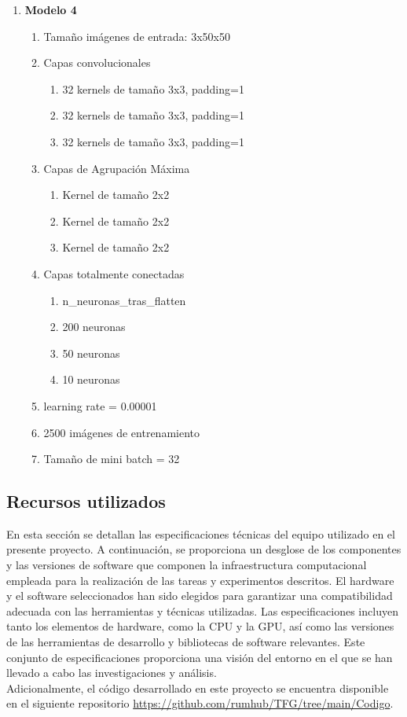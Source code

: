 \begin{enumerate}
	\item \textbf{Modelo 4}
	\begin{enumerate}[label=\textbullet, nosep]
		\item Tamaño imágenes de entrada: 3x50x50
		\item Capas convolucionales
		\begin{enumerate}[label=\textbullet, nosep]
			\item 32 kernels de tamaño 3x3, padding=1
			\item 32 kernels de tamaño 3x3, padding=1
			\item 32 kernels de tamaño 3x3, padding=1
		\end{enumerate}
		\item Capas de Agrupación Máxima
		\begin{enumerate}[label=\textbullet, nosep]
			\item Kernel de tamaño 2x2
			\item Kernel de tamaño 2x2
			\item Kernel de tamaño 2x2
		\end{enumerate}
		\item Capas totalmente conectadas
		\begin{enumerate}[label=\textbullet, nosep]
			\item n\_neuronas\_tras\_flatten
			\item 200 neuronas
			\item 50 neuronas
			\item 10 neuronas
		\end{enumerate}
		\item learning rate = 0.00001
		\item 2500 imágenes de entrenamiento
		\item Tamaño de mini batch = 32
	\end{enumerate}		

	
\end{enumerate}

\subsection{Recursos utilizados}

En esta sección se detallan las especificaciones técnicas del equipo utilizado en el presente proyecto. A continuación, se proporciona un desglose de los componentes y las versiones de software que componen la infraestructura computacional empleada para la realización de las tareas y experimentos descritos. El hardware y el software seleccionados han sido elegidos para garantizar una compatibilidad adecuada con las herramientas y técnicas utilizadas. Las especificaciones incluyen tanto los elementos de hardware, como la CPU y la GPU, así como las versiones de las herramientas de desarrollo y bibliotecas de software relevantes. Este conjunto de especificaciones proporciona una visión del entorno en el que se han llevado a cabo las investigaciones y análisis. \\
Adicionalmente, el código desarrollado en este proyecto se encuentra disponible en el siguiente repositorio \url{https://github.com/rumhub/TFG/tree/main/Codigo}. \\

